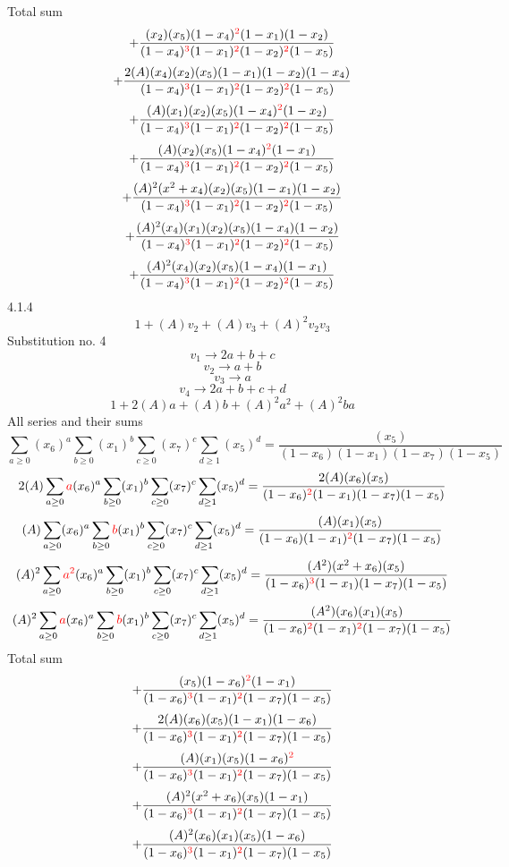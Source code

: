 \documentclass{article}
\begin{document}
Total sum
\[+\frac{(x_2)(x_5)(1-x_4)^{\textcolor{red}{2}}(1-x_1)(1-x_2)}{(1-x_4)^{\textcolor{red}{3}}(1-x_1)^{\textcolor{red}{2}}(1-x_2)^{\textcolor{red}{2}}(1-x_5)}\]\[+\frac{2(A)(x_4)(x_2)(x_5)(1-x_1)(1-x_2)(1-x_4)}{(1-x_4)^{\textcolor{red}{3}}(1-x_1)^{\textcolor{red}{2}}(1-x_2)^{\textcolor{red}{2}}(1-x_5)}\]\[+\frac{(A)(x_1)(x_2)(x_5)(1-x_4)^{\textcolor{red}{2}}(1-x_2)}{(1-x_4)^{\textcolor{red}{3}}(1-x_1)^{\textcolor{red}{2}}(1-x_2)^{\textcolor{red}{2}}(1-x_5)}\]\[+\frac{(A)(x_2)(x_5)(1-x_4)^{\textcolor{red}{2}}(1-x_1)}{(1-x_4)^{\textcolor{red}{3}}(1-x_1)^{\textcolor{red}{2}}(1-x_2)^{\textcolor{red}{2}}(1-x_5)}\]\[+\frac{(A)^{2}(x^{2}+x_4)(x_2)(x_5)(1-x_1)(1-x_2)}{(1-x_4)^{\textcolor{red}{3}}(1-x_1)^{\textcolor{red}{2}}(1-x_2)^{\textcolor{red}{2}}(1-x_5)}\]\[+\frac{(A)^{2}(x_4)(x_1)(x_2)(x_5)(1-x_4)(1-x_2)}{(1-x_4)^{\textcolor{red}{3}}(1-x_1)^{\textcolor{red}{2}}(1-x_2)^{\textcolor{red}{2}}(1-x_5)}\]\[+\frac{(A)^{2}(x_4)(x_2)(x_5)(1-x_4)(1-x_1)}{(1-x_4)^{\textcolor{red}{3}}(1-x_1)^{\textcolor{red}{2}}(1-x_2)^{\textcolor{red}{2}}(1-x_5)}\]
4.1.4
\[1+(A)v_2+(A)v_3+(A)^2v_2v_3\]Substitution no. 4\[v_1\rightarrow{2a+b+c}\]\[v_2\rightarrow{a+b}\]\[v_3\rightarrow{a}\]\[v_4\rightarrow{2a+b+c+d}\]\[1+2(A)a+(A)b+(A)^2a^{2}+(A)^2ba\]All series and their sums\[\sum_{a\geq{0}}(x_6)^{a}\sum_{b\geq{0}}(x_1)^{b}\sum_{c\geq{0}}(x_7)^{c}\sum_{d\geq{1}}(x_5)^{d}=\frac{(x_5)}{(1-x_6)(1-x_1)(1-x_7)(1-x_5)}\]\[2(A)\sum_{a\geq{0}}\textcolor{red}{a}(x_6)^{a}\sum_{b\geq{0}}(x_1)^{b}\sum_{c\geq{0}}(x_7)^{c}\sum_{d\geq{1}}(x_5)^{d}=\frac{2(A)(x_6)(x_5)}{(1-x_6)^{\textcolor{red}{2}}(1-x_1)(1-x_7)(1-x_5)}\]\[(A)\sum_{a\geq{0}}(x_6)^{a}\sum_{b\geq{0}}\textcolor{red}{b}(x_1)^{b}\sum_{c\geq{0}}(x_7)^{c}\sum_{d\geq{1}}(x_5)^{d}=\frac{(A)(x_1)(x_5)}{(1-x_6)(1-x_1)^{\textcolor{red}{2}}(1-x_7)(1-x_5)}\]\[(A)^{2}\sum_{a\geq{0}}\textcolor{red}{a^{2}}(x_6)^{a}\sum_{b\geq{0}}(x_1)^{b}\sum_{c\geq{0}}(x_7)^{c}\sum_{d\geq{1}}(x_5)^{d}=\frac{(A^{2})(x^{2}+x_6)(x_5)}{(1-x_6)^{\textcolor{red}{3}}(1-x_1)(1-x_7)(1-x_5)}\]\[(A)^{2}\sum_{a\geq{0}}\textcolor{red}{a}(x_6)^{a}\sum_{b\geq{0}}\textcolor{red}{b}(x_1)^{b}\sum_{c\geq{0}}(x_7)^{c}\sum_{d\geq{1}}(x_5)^{d}=\frac{(A^{2})(x_6)(x_1)(x_5)}{(1-x_6)^{\textcolor{red}{2}}(1-x_1)^{\textcolor{red}{2}}(1-x_7)(1-x_5)}\]
Total sum
\[+\frac{(x_5)(1-x_6)^{\textcolor{red}{2}}(1-x_1)}{(1-x_6)^{\textcolor{red}{3}}(1-x_1)^{\textcolor{red}{2}}(1-x_7)(1-x_5)}\]\[+\frac{2(A)(x_6)(x_5)(1-x_1)(1-x_6)}{(1-x_6)^{\textcolor{red}{3}}(1-x_1)^{\textcolor{red}{2}}(1-x_7)(1-x_5)}\]\[+\frac{(A)(x_1)(x_5)(1-x_6)^{\textcolor{red}{2}}}{(1-x_6)^{\textcolor{red}{3}}(1-x_1)^{\textcolor{red}{2}}(1-x_7)(1-x_5)}\]\[+\frac{(A)^{2}(x^{2}+x_6)(x_5)(1-x_1)}{(1-x_6)^{\textcolor{red}{3}}(1-x_1)^{\textcolor{red}{2}}(1-x_7)(1-x_5)}\]\[+\frac{(A)^{2}(x_6)(x_1)(x_5)(1-x_6)}{(1-x_6)^{\textcolor{red}{3}}(1-x_1)^{\textcolor{red}{2}}(1-x_7)(1-x_5)}\]
\end{document}
